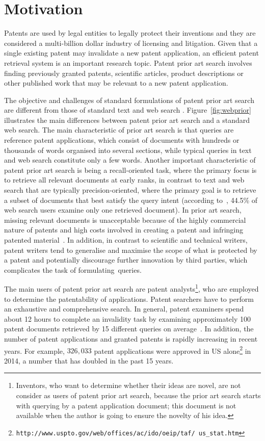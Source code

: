 \section{Motivation}
\label{sec:Motivation}
Patents are used by legal entities to legally protect their inventions and they are considered a multi-billion dollar industry of licensing and litigation. Given that a single existing patent may invalidate a new patent application, an efficient patent retrieval system is an important research topic. 
Patent prior art search involves finding previously granted patents, scientific articles, product
descriptions or other published work that may be relevant to a new patent application. 

The objective and challenges of standard formulations of patent prior art
search are different from those of standard text and web search \citep{magdy2012toward}.
Figure~\ref{fig:webprior} illustrates the main differences between 
patent prior art search and a standard web search.
The main characteristic of prior art search is that queries are reference patent
applications, which consist of documents with hundreds or thousands of
words organised into several sections, while typical queries in text
and web search constitute only a few words. 
Another important characteristic of patent prior art
search is being a recall-oriented task, where the primary focus is to
retrieve all relevant documents at early ranks, in contrast to text
and web search that are typically precision-oriented, where the primary goal is
to retrieve a subset of documents that best satisfy the query
intent (according to~\citep{zhang2010search}, 44.5\% of web search users examine only one retrieved document). 
In prior art search, missing relevant documents is unacceptable because of the highly commercial nature of patents and high costs involved
in creating a patent and infringing patented material~\citep{joho2010survey}. 
In addition, in contrast to scientific and technical writers, patent writers
tend to generalise and maximise the scope of what is protected by a
patent and potentially discourage further innovation by third parties,
which complicates the task of formulating~queries. 

The main users of patent prior art search are 
patent analysts\footnote{Inventors, who want to determine whether their ideas are novel, 
are not consider as users of patent prior art search, because the prior art search starts with querying by a patent application document; this document is not available when  the author is going to ensure the novelty of his idea.}, 
who are employed to determine the patentability 
of applications. 
Patent searchers have to perform an exhaustive and comprehensive search. In general, patent
examiners spend about 12 hours to complete an invalidity task by examining
approximately 100 patent documents retrieved by 15 different queries on average~\citep{joho2010survey}. 
In addition, the number of patent applications and granted patents is rapidly increasing in recent years. For example, $326,033$ patent applications were approved in US alone\footnote{\texttt{http://www.uspto.gov/web/offices/ac/ido/oeip/taf/ us\_stat.htm}} in 2014, a number that has doubled in the past 15 years.

